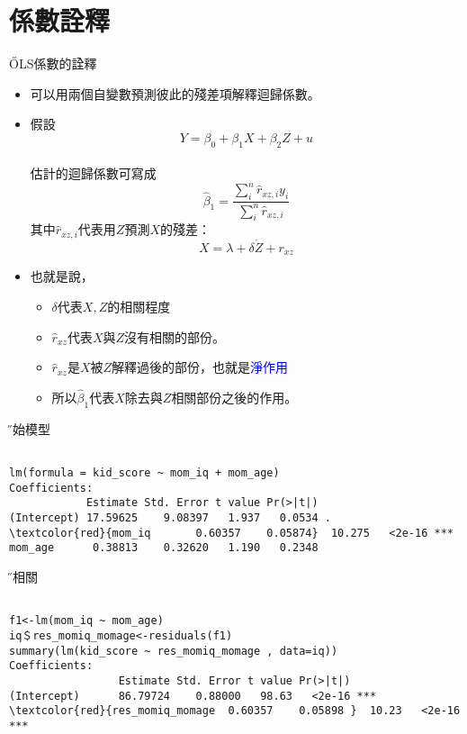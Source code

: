 \documentclass[xcolor=dvipsnames]{beamer}
\begin{document}
\section{係數詮釋}
\begin{frame}{\H OLS係數的詮釋}
\begin{itemize}
\item 可以用兩個自變數預測彼此的殘差項解釋迴歸係數。
\item 假設\[Y=\beta_{0}+\beta_{1}X+\beta_{2}Z+u\] \\
估計的迴歸係數可寫成\[\hat{\beta}_{1}=\frac{\sum_{i}^{n}\hat{r}_{xz,i}y_{i}}{\sum_{i}^{n}\hat{r}_{xz,i}}\]
其中$\hat{r}_{xz,i}$代表用$Z$預測$X$的殘差：
\[X=\lambda+\delta\dot Z+r_{xz}\]
\item 也就是說，
\begin{itemize}
\item $\delta$代表$X,Z$的相關程度
\item $\hat{r}_{xz}$代表$X$與$Z$沒有相關的部份。
\item $\hat{r}_{xz}$是$X$被$Z$解釋過後的部份，也就是\textcolor{blue}{淨作用}
\item 所以$\hat{\beta}_{1}$代表$X$除去與$Z$相關部份之後的作用。
\end{itemize}
\end{itemize}
\end{frame}

\begin{frame}[fragile=singleslide]{\H 原始模型}
\begin{Verbatim}[frame=single,label=R code,
fontseries=b,xleftmargin=2mm,commandchars=\\\{\},
formatcom=\color{blue}]

lm(formula = kid_score ~ mom_iq + mom_age)
Coefficients:
            Estimate Std. Error t value Pr(>|t|)    
(Intercept) 17.59625    9.08397   1.937   0.0534 .  
\textcolor{red}{mom_iq       0.60357    0.05874}  10.275   <2e-16 ***
mom_age      0.38813    0.32620   1.190   0.2348   
\end{Verbatim}
\end{frame}

\begin{frame}[fragile=singleslide]{\H 淨相關}
\begin{Verbatim}[frame=single,label=R code,
fontseries=b,xleftmargin=2mm,commandchars=\\\{\},
formatcom=\color{blue}]

f1<-lm(mom_iq ~ mom_age)
iq＄res_momiq_momage<-residuals(f1)
summary(lm(kid_score ~ res_momiq_momage , data=iq))
Coefficients:
                 Estimate Std. Error t value Pr(>|t|)    
(Intercept)      86.79724    0.88000   98.63   <2e-16 ***
\textcolor{red}{res_momiq_momage  0.60357    0.05898 }  10.23   <2e-16 ***
\end{Verbatim}
\end{frame}
\end{document}
